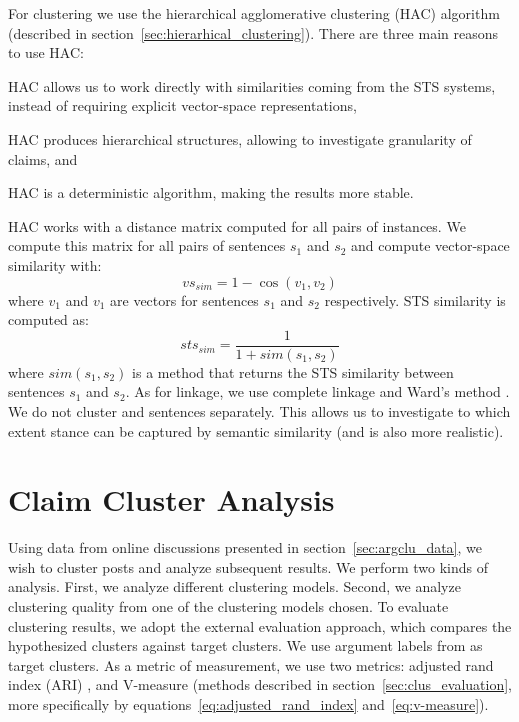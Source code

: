 For clustering we use the hierarchical agglomerative clustering (HAC) algorithm
(described in section~\ref{sec:hierarhical_clustering}). 
There are three main reasons to use HAC: 
\begin{enumerate*}
\item HAC allows us to work directly with similarities
coming from the STS systems, instead of requiring explicit vector-space representations, 
\item HAC produces hierarchical structures, allowing to investigate
granularity of claims, and
\item HAC is a deterministic algorithm, making the results more stable.
\end{enumerate*}
HAC works with a distance matrix computed for all pairs of instances. 
We compute this matrix for all pairs of sentences $s_1$ and $s_2$ and 
compute vector-space similarity with: 
$$
\mathit{vs_{sim}} = 1 - \cos(v_1, v_2)
$$ 
where $v_1$ and $v_1$ are vectors for sentences $s_1$ and $s_2$ respectively.
STS similarity is computed as:
$$
\mathit{sts_{sim}} = \frac{1}{1 + \mathit{sim}(s_1, s_2)}
$$
where $\mathit{sim}(s_1, s_2)$ is a method that returns the STS similarity
between sentences $s_1$ and $s_2$. 
As for linkage, we use complete linkage and Ward's method \citep{ward1963hierarchical}. 
We do not cluster  and  sentences separately. 
This allows us to investigate to which extent stance can be captured by 
semantic similarity (and is also more realistic). 

\section{Claim Cluster Analysis}
\label{sec:argclu_analysis}

Using data from online discussions presented in section~\ref{sec:argclu_data}, 
we wish to cluster posts and analyze subsequent results. 
We perform two kinds of analysis. First, we analyze different clustering models. 
Second, we analyze clustering quality from one of the clustering models chosen. 
To evaluate clustering results, we adopt the external evaluation approach, which compares the 
hypothesized clusters against target clusters. 
We use argument labels from \citet{hasan2014you} as target clusters. 
As a metric of measurement, we use two metrics: 
adjusted rand index (ARI) 
\citep{steinley2004properties}, and V-measure \citep{rosenberg2007v}
(methods described in section~\ref{sec:clus_evaluation}, more specifically by 
equations~\ref{eq:adjusted_rand_index} and~\ref{eq:v-measure}). 

